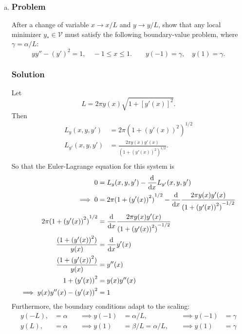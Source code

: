 \documentclass[12pt,twoside]{article}
\begin{document}
\begin{enumerate}[(a)]
\item
\subsubsection*{Problem}
After a change of variable $x\rightarrow x/L$ and $y\rightarrow y/L$, show that
any local minimizer $y_*\in \mathcal{V}$ must satisfy the following
boundary-value problem, where $\gamma=\alpha/L$:
\begin{equation}
  \label{eq:minilab.a-problem}
  yy''-{(y')}^2=1,\quad -1\le x\le1. \qquad y(-1)=\gamma,\quad y(1)=\gamma.
\end{equation}

\subsubsection*{Solution}
Let
$$L = 2\pi y(x) \sqrt{1 + {\left[ y'(x) \right]}^2}.$$
Then
\begin{align*}
  L_y(x,y,y') &= 2\pi {(1+{(y'(x))}^2)}^{1/2} \\
  L_{y'}(x,y,y') &= \frac{2\pi y(x) y'(x)}{{(1+{(y'(x))}^2)}^{1/2}}. \\
\end{align*}
So that the Euler-Lagrange equation for this system is
\begin{align*}
  0 &= L_y(x,y,y') - \frac{\mathrm{d}^{} {}}{\mathrm{d}{x}^{}}L_{y'}(x,y,y') \\
  \implies 0 &= 2\pi {(1+{(y'(x))}^2)}^{1/2} - \frac{\mathrm{d}^{} {}}{\mathrm{d}{x}^{}} \frac{2\pi y(x) y'(x)}{{(1+{(y'(x))}^2)}^{-1/2}} \\
  2\pi {(1+{(y'(x))}^2)}^{1/2} &= \frac{\mathrm{d}^{} {}}{\mathrm{d}{x}^{}} \frac{2\pi y(x) y'(x)}{{(1+{(y'(x))}^2)}^{-1/2}} \\
  \frac{(1+{(y'(x))}^2)}{y(x)} &= \frac{\mathrm{d}^{} {}}{\mathrm{d}{x}^{}} y'(x) \\
  \frac{(1+{(y'(x))}^2)}{y(x)} &= y''(x) \\
  1+{(y'(x))}^2 &= y(x) y''(x) \\
  \implies y(x) y''(x) - {(y'(x))}^2 &= 1 \\
\end{align*}
Furthermore, the boundary conditions adapt to the scaling:
\begin{align*}
  y(-L), &= \alpha &\quad\implies y(-1) &= \alpha/L, &\quad\implies y(-1) &= \gamma \\
  y(L), &= \alpha &\quad\implies y(1) &= \beta/L=\alpha/L, &\quad\implies y(1) &= \gamma \\
\end{align*}


\end{enumerate}
\end{document}
